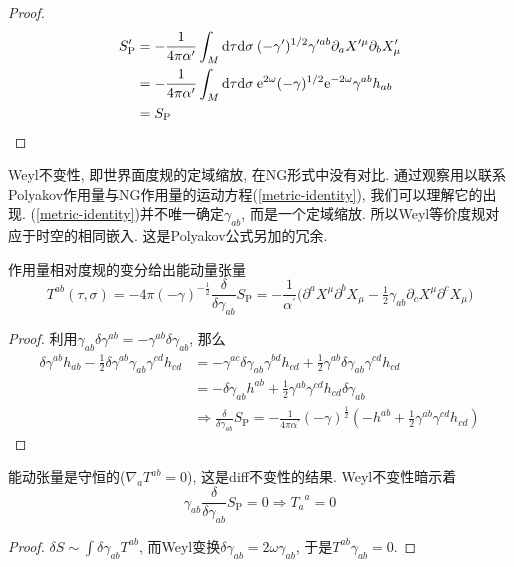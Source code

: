 \begin{proof}
    \begin{align}
        S^\prime_{\mathrm{P}} &= -\frac{1}{4\pi\alpha^\prime}\int_M \mathrm{d}\tau\mathrm{d}\sigma\: (-\gamma^\prime)^{1/2}\gamma^{\prime ab}\partial_a X^{\prime \mu}\partial_b X^\prime _\mu \nonumber \\
        &= -\frac{1}{4\pi\alpha^\prime}\int_M \mathrm{d}\tau\mathrm{d}\sigma\: \mathrm{e}^{2\omega}(-\gamma)^{1/2}\mathrm{e}^{-2\omega}\gamma^{ab}h_{ab} \nonumber \\
        &= S_{\mathrm{P}} \nonumber
        \end{align}
\end{proof}
Weyl不变性, 即世界面度规的定域缩放, 在NG形式中没有对比. 通过观察用以联系Polyakov作用量与NG作用量的运动方程(\ref{metric-identity}), 我们可以理解它的出现. (\ref{metric-identity})并不唯一确定$\gamma_{ab}$, 而是一个定域缩放. 所以Weyl等价度规对应于时空的相同嵌入. 这是Polyakov公式另加的冗余. 

作用量相对度规的变分给出能动量张量
\begin{equation}
T^{ab}(\tau,\sigma)=-4\pi(-\gamma)^{-\frac{1}{2}}\frac{\delta}{\delta\gamma_{ab}}S_{\mathrm{P}}=-\frac{1}{\alpha^\prime}\bigl(\partial^a X^\mu \partial^b X_\mu-\tfrac{1}{2}\gamma_{ab}\partial_c X^\mu \partial^c X_\mu\bigr)
\end{equation}
\begin{proof}
    利用$\gamma_{ab}\delta \gamma^{ab}=-\gamma^{ab}\delta\gamma_{ab}$, 那么
\begin{align*}
\delta \gamma^{ab}h_{ab}-\tfrac{1}{2}\delta \gamma^{ab}\gamma_{ab}\gamma^{cd}h_{cd} \nonumber
&=-\gamma^{ac}\delta\gamma_{ab}\gamma^{bd}h_{cd}+\tfrac{1}{2}\gamma^{ab}\delta\gamma_{ab}\gamma^{cd}h_{cd} \nonumber\\
&=-\delta\gamma_{ab}h^{ab}+\tfrac{1}{2}\gamma^{ab}\gamma^{cd}h_{cd}\delta\gamma_{ab} \nonumber \\
&\Longrightarrow 
\frac{\delta}{\delta\gamma_{ab}}S_{\mathrm{P}}=-\frac{1}{4\pi\alpha^\prime}(-\gamma)^{\frac{1}{2}}(-h^{ab}+\tfrac{1}{2}\gamma^{ab}\gamma^{cd}h_{cd})
\end{align*}
\end{proof}
能动张量是守恒的($\nabla_a T^{ab}=0$), 这是diff不变性的结果. 
Weyl不变性暗示着
\begin{equation}
\gamma_{ab}\frac{\delta}{\delta\gamma_{ab}}S_{\mathrm{P}}=0 \Rightarrow {T_a} ^a=0
\end{equation}
\begin{proof}
    $\delta S \sim \int \delta\gamma_{ab} T^{ab}$, 而Weyl变换$\delta\gamma_{ab}=2\omega \gamma_{ab}$, 于是$T^{ab}\gamma_{ab}=0$.
\end{proof}

